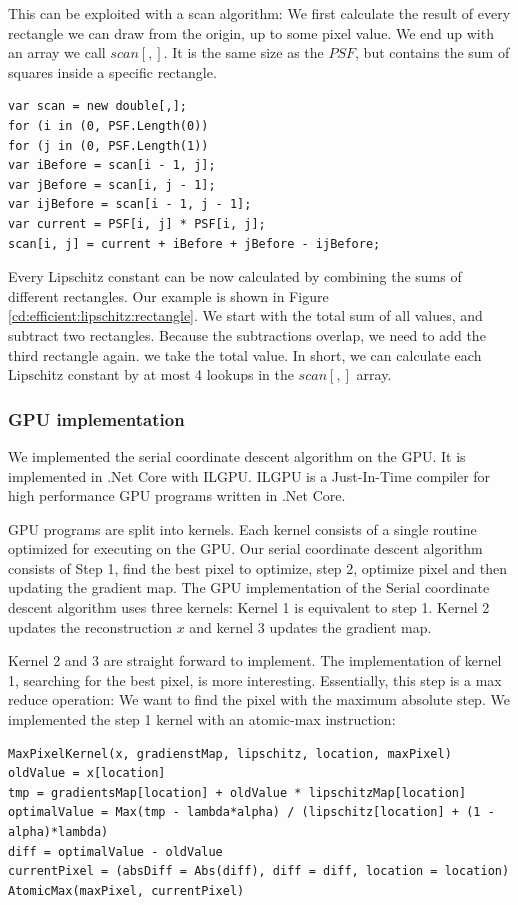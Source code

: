 This can be exploited with a scan algorithm: We first calculate the result of every rectangle we can draw from the origin, up to some pixel value. We end up with an array we call $scan[,]$. It is the same size as the $PSF$, but contains the sum of squares inside a specific rectangle.

\begin{lstlisting}
var scan = new double[,];
for (i in (0, PSF.Length(0))
for (j in (0, PSF.Length(1))
var iBefore = scan[i - 1, j];
var jBefore = scan[i, j - 1];
var ijBefore = scan[i - 1, j - 1];
var current = PSF[i, j] * PSF[i, j];
scan[i, j] = current + iBefore + jBefore - ijBefore;
\end{lstlisting}

Every Lipschitz constant can be now calculated by combining the sums of different rectangles. Our example is shown in Figure \ref{cd:efficient:lipschitz:rectangle}. We start with the total sum of all values, and subtract two rectangles. Because the subtractions overlap, we need to add the third rectangle again. we take the total value. In short, we can calculate each Lipschitz constant by at most 4 lookups in the $scan[,]$ array.


\subsubsection*{GPU implementation}
We implemented the serial coordinate descent algorithm on the GPU. It is implemented in .Net Core with ILGPU\cite{ilgpu}. ILGPU is a Just-In-Time compiler for high performance GPU programs written in .Net Core.

GPU programs are split into kernels. Each kernel consists of a single routine optimized for executing on the GPU. Our serial coordinate descent algorithm consists of Step 1, find the best pixel to optimize, step 2, optimize pixel and then updating the gradient map. The GPU implementation of the Serial coordinate descent algorithm uses three kernels: Kernel 1 is equivalent to step 1. Kernel 2 updates the reconstruction $x$ and kernel 3 updates the gradient map.

Kernel 2 and 3 are straight forward to implement. The implementation of kernel 1, searching for the best pixel, is more interesting. Essentially, this step is a max reduce operation: We want to find the pixel with the maximum absolute step. We implemented the step 1 kernel with an atomic-max instruction:
\begin{lstlisting}
MaxPixelKernel(x, gradienstMap, lipschitz, location, maxPixel)
oldValue = x[location]
tmp = gradientsMap[location] + oldValue * lipschitzMap[location]
optimalValue = Max(tmp - lambda*alpha) / (lipschitz[location] + (1 - alpha)*lambda)
diff = optimalValue - oldValue
currentPixel = (absDiff = Abs(diff), diff = diff, location = location)
AtomicMax(maxPixel, currentPixel)
\end{lstlisting}

